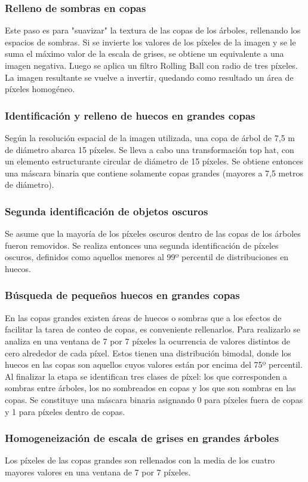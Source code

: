 \subsubsection{Relleno de sombras en copas}
Este paso es para "suavizar" la textura de las copas de los árboles, rellenando los espacios de sombras.
Si se invierte los valores de los píxeles de la imagen y se le suma el máximo valor de la escala de grises, se obtiene un equivalente a una imagen negativa. Luego se aplica un filtro Rolling Ball con radio de tres píxeles. La imagen resultante se vuelve a invertir, quedando como resultado un área de píxeles homogéneo.
\subsubsection{Identificación y relleno de huecos en grandes copas}
Según la resolución espacial de la imagen utilizada, una copa de árbol de 7,5 m de diámetro abarca 15 píxeles. Se lleva a cabo una transformación top hat, con un elemento estructurante circular de diámetro de 15 píxeles. Se obtiene entonces una máscara binaria que contiene solamente copas grandes (mayores a 7,5 metros de diámetro).
\subsubsection{ Segunda identificación de objetos oscuros}
Se asume que la mayoría de los píxeles oscuros dentro de las copas de los árboles fueron removidos. Se realiza entonces una segunda identificación de píxeles oscuros, definidos como aquellos menores al 99º percentil de distribuciones en huecos.
\subsubsection{Búsqueda de pequeños huecos en grandes copas}
En las copas grandes existen áreas de huecos o sombras que a los efectos de facilitar la tarea de conteo de copas, es conveniente rellenarlos. Para realizarlo se analiza en una ventana de 7 por 7 píxeles la ocurrencia de valores distintos de cero alrededor de cada píxel. Estos tienen una distribución bimodal, donde los huecos en las copas son aquellos cuyos valores están por encima del 75º percentil. Al finalizar la etapa se identifican tres clases de píxel: los que corresponden a sombras entre árboles, los no sombreados en copas y los que son sombras en las copas. Se constituye una máscara binaria asignando 0 para píxeles fuera de copas y 1 para píxeles dentro de copas.
\subsubsection{Homogeneización de escala de grises en grandes árboles}
Los píxeles de las copas grandes son rellenados con la media de los cuatro mayores valores en una ventana de 7 por 7 píxeles.
